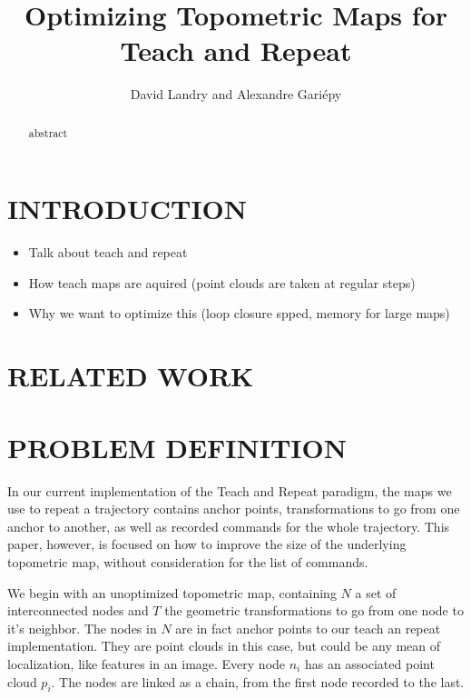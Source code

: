 \documentclass[letterpaper,10 pt,conference]{ieeeconf}
\title{\LARGE \bf
  Optimizing Topometric Maps for Teach and Repeat
}
\author{David Landry and Alexandre Gari\'epy}
\begin{document}
\maketitle
\thispagestyle{empty}
\pagestyle{empty}


\begin{abstract}

  abstract

\end{abstract}

\section{INTRODUCTION}



\begin{itemize}
    \item Talk about teach and repeat
    \item How teach maps are aquired (point clouds are taken at regular steps)
    \item Why we want to optimize this (loop closure spped, memory for large maps)
\end{itemize}


\section{RELATED WORK}


\section{PROBLEM DEFINITION}

In our current implementation of the Teach and Repeat paradigm, the maps we use to repeat a
trajectory contains anchor points, transformations to go from one anchor to another, as well as
recorded commands for the whole trajectory. This paper, however, is focused on how to improve the
size of the underlying topometric map, without consideration for the list of commands.

We begin with an unoptimized topometric map, containing $N$ a set of interconnected nodes and $T$
the geometric transformations to go from one node to it's neighbor. The nodes in $N$ are in fact
anchor points to our teach an repeat implementation. They are point clouds in this case, but could
be any mean of localization, like features in an image. Every node $n_i$ has an associated point
cloud $p_i$. The nodes are linked as a chain, from the first node recorded to the last.
\end{document}
